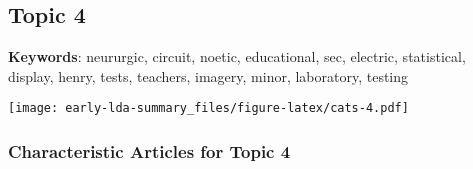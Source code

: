 \documentclass[
]{article}
\begin{document}
\newpage

\hypertarget{topic-4}{%
\subsection{Topic 4}\label{topic-4}}

\textbf{Keywords}: neururgic, circuit, noetic, educational, sec,
electric, statistical, display, henry, tests, teachers, imagery, minor,
laboratory, testing

\texttt{[image: early-lda-summary\_files/figure-latex/cats-4.pdf]}
\newpage 

\hypertarget{characteristic-articles-for-topic-4}{%
\subsubsection{Characteristic Articles for Topic
4}\label{characteristic-articles-for-topic-4}}
\end{document}
